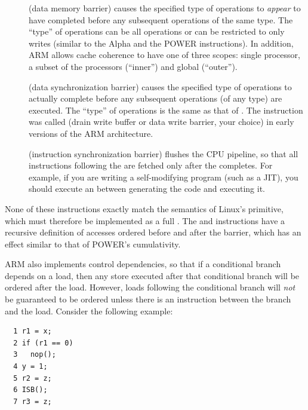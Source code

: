 \begin{description}
\item	[] (data memory barrier) causes the specified type of
	operations to \emph{appear} to have completed before any
	subsequent operations of the same type.
	The ``type'' of operations can be all operations or can be
	restricted to only writes (similar to the Alpha 
	and the POWER  instructions).
	In addition, ARM allows cache coherence to have one of three
	scopes: single processor, a subset of the processors
	(``inner'') and global (``outer'').
\item	[] (data synchronization barrier) causes the specified
	type of operations to actually complete before any subsequent
	operations (of any type) are executed.
	The ``type'' of operations is the same as that of .
	The  instruction was called  (drain write buffer
	or data write barrier, your choice) in early versions of the
	ARM architecture.
\item	[] (instruction synchronization barrier) flushes the CPU
	pipeline, so that all instructions following the 
	are fetched only after the  completes.
	For example, if you are writing a self-modifying program
	(such as a JIT), you should execute an  between
	generating the code and executing it.
\end{description}

None of these instructions exactly match the semantics of Linux's
 primitive, which must therefore be implemented as a full
.
The  and  instructions have a recursive definition
of accesses ordered before and after the barrier, which has an effect
similar to that of POWER's cumulativity.

ARM also implements control dependencies, so that if a conditional
branch depends on a load, then any store executed after that conditional
branch will be ordered after the load.
However, loads following the conditional branch will \emph{not}
be guaranteed to be ordered unless there is an 
instruction between the branch and the load.
Consider the following example:

\vspace{5pt}
\begin{minipage}[t]{\columnwidth}
\small
\begin{verbatim}
  1 r1 = x;
  2 if (r1 == 0)
  3   nop();
  4 y = 1;
  5 r2 = z;
  6 ISB();
  7 r3 = z;
\end{verbatim}
\end{minipage}
\vspace{5pt}

